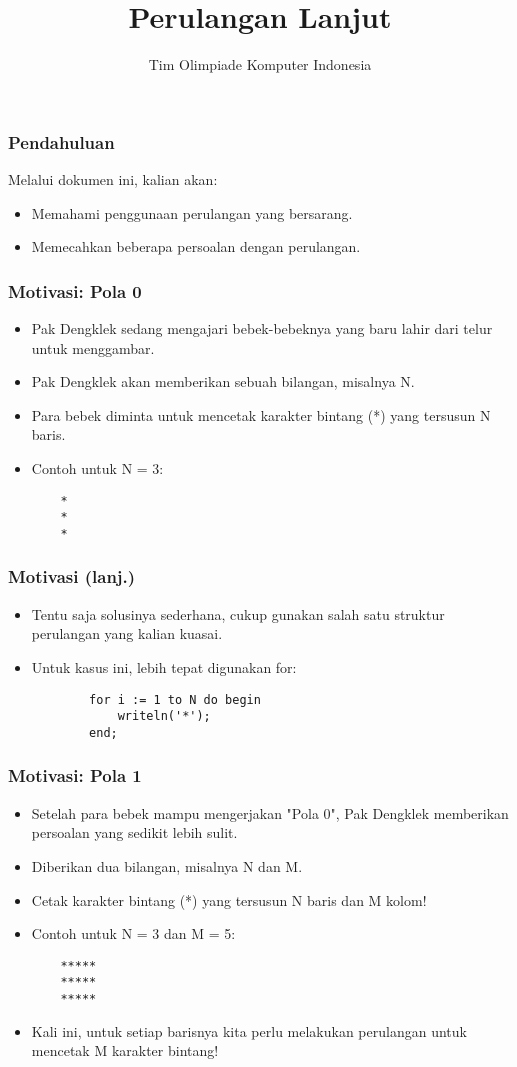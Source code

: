 \documentclass{beamer}
\title{Perulangan Lanjut}
\author{Tim Olimpiade Komputer Indonesia}
\begin{document}
\begin{frame}
\titlepage
\end{frame}

\begin{frame}
\frametitle{Pendahuluan}
Melalui dokumen ini, kalian akan:
\begin{itemize}
	\item Memahami penggunaan perulangan yang bersarang.
	\item Memecahkan beberapa persoalan dengan perulangan.
\end{itemize}
\end{frame}

\begin{frame}[fragile]
\frametitle{Motivasi: Pola 0}
\begin{itemize}
	\item Pak Dengklek sedang mengajari bebek-bebeknya yang baru lahir dari telur untuk menggambar.
	\item Pak Dengklek akan memberikan sebuah bilangan, misalnya N.
	\item Para bebek diminta untuk mencetak karakter bintang (*) yang tersusun N baris.
	\item Contoh untuk N = 3:
	\begin{lstlisting}
	*
	*
	*
	\end{lstlisting}
\end{itemize}
\end{frame}

\begin{frame}[fragile]
\frametitle{Motivasi (lanj.)}
\begin{itemize}
	\item Tentu saja solusinya sederhana, cukup gunakan salah satu struktur perulangan yang kalian kuasai.
	\item Untuk kasus ini, lebih tepat digunakan for:
	\begin{lstlisting}
		for i := 1 to N do begin
		    writeln('*');
		end;
	\end{lstlisting}	
\end{itemize}
\end{frame}

\begin{frame}[fragile]
\frametitle{Motivasi: Pola 1}
\begin{itemize}
	\item Setelah para bebek mampu mengerjakan "Pola 0", Pak Dengklek memberikan persoalan yang sedikit lebih sulit.
	\item Diberikan dua bilangan, misalnya N dan M.
	\item Cetak karakter bintang (*) yang tersusun N baris dan M kolom!
	
	\item Contoh untuk N = 3 dan M = 5:
	\begin{lstlisting}
	*****
	*****
	*****
	\end{lstlisting}
	
	\item Kali ini, untuk setiap barisnya kita perlu melakukan perulangan untuk mencetak M karakter bintang!
\end{itemize}
\end{frame}
\end{document}
